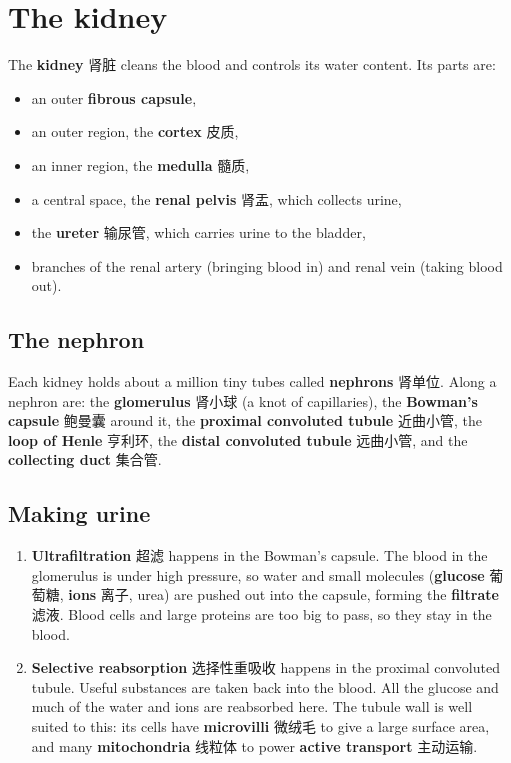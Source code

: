 \documentclass[11pt]{article}
\begin{document}
\section*{The kidney}

The \textbf{kidney} 肾脏 cleans the blood and controls its water content. Its parts are:

\begin{itemize}
\item an outer \textbf{fibrous capsule},

\item an outer region, the \textbf{cortex} 皮质,

\item an inner region, the \textbf{medulla} 髓质,

\item a central space, the \textbf{renal pelvis} 肾盂, which collects urine,

\item the \textbf{ureter} 输尿管, which carries urine to the bladder,

\item branches of the renal artery (bringing blood in) and renal vein (taking blood out).

\end{itemize}

\subsection*{The nephron}

Each kidney holds about a million tiny tubes called \textbf{nephrons} 肾单位. Along a nephron are: the \textbf{glomerulus} 肾小球 (a knot of capillaries), the \textbf{Bowman's capsule} 鲍曼囊 around it, the \textbf{proximal convoluted tubule} 近曲小管, the \textbf{loop of Henle} 亨利环, the \textbf{distal convoluted tubule} 远曲小管, and the \textbf{collecting duct} 集合管.

\subsection*{Making urine}

\begin{enumerate}
\item \textbf{Ultrafiltration} 超滤 happens in the Bowman's capsule. The blood in the glomerulus is under high pressure, so water and small molecules (\textbf{glucose} 葡萄糖, \textbf{ions} 离子, urea) are pushed out into the capsule, forming the \textbf{filtrate} 滤液. Blood cells and large proteins are too big to pass, so they stay in the blood.

\item \textbf{Selective reabsorption} 选择性重吸收 happens in the proximal convoluted tubule. Useful substances are taken back into the blood. All the glucose and much of the water and ions are reabsorbed here. The tubule wall is well suited to this: its cells have \textbf{microvilli} 微绒毛 to give a large surface area, and many \textbf{mitochondria} 线粒体 to power \textbf{active transport} 主动运输.

\end{enumerate}
\end{document}
